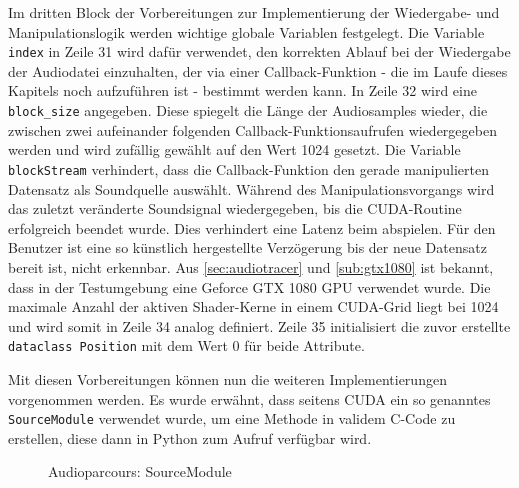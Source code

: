 Im dritten Block der Vorbereitungen zur Implementierung der Wiedergabe- und Manipulationslogik werden wichtige globale Variablen festgelegt. Die Variable \texttt{index} in Zeile 31 wird dafür verwendet, den korrekten Ablauf bei der Wiedergabe der Audiodatei einzuhalten, der via einer Callback-Funktion - die im Laufe dieses Kapitels noch aufzuführen ist - bestimmt werden kann. In Zeile 32 wird eine \texttt{block\_size} angegeben. Diese spiegelt die Länge der Audiosamples wieder, die zwischen zwei aufeinander folgenden Callback-Funktionsaufrufen wiedergegeben werden und wird zufällig gewählt auf den Wert 1024 gesetzt. Die Variable \texttt{blockStream} verhindert, dass die Callback-Funktion den gerade manipulierten Datensatz als Soundquelle auswählt. Während des Manipulationsvorgangs wird das zuletzt veränderte Soundsignal wiedergegeben, bis die CUDA-Routine erfolgreich beendet wurde. Dies verhindert eine Latenz beim abspielen. Für den Benutzer ist eine so künstlich hergestellte Verzögerung bis der neue Datensatz bereit ist, nicht erkennbar. Aus \ref{sec:audiotracer} und \ref{sub:gtx1080} ist bekannt, dass in der Testumgebung eine Geforce GTX 1080 GPU verwendet wurde. Die maximale Anzahl der aktiven Shader-Kerne in einem CUDA-Grid liegt bei 1024 und wird somit in Zeile 34 analog definiert. Zeile 35 initialisiert die zuvor erstellte \texttt{dataclass Position} mit dem Wert 0 für beide Attribute. 

Mit diesen Vorbereitungen können nun die weiteren Implementierungen vorgenommen werden. Es wurde erwähnt, dass seitens CUDA ein so genanntes \texttt{SourceModule} verwendet wurde, um eine Methode in validem C-Code zu erstellen, diese dann in Python zum Aufruf verfügbar wird. 

\begin{figure}[h!]
	
	\caption{Audioparcours: SourceModule}
	\label{fig:audioparkour_SourceModule}
\end{figure}

